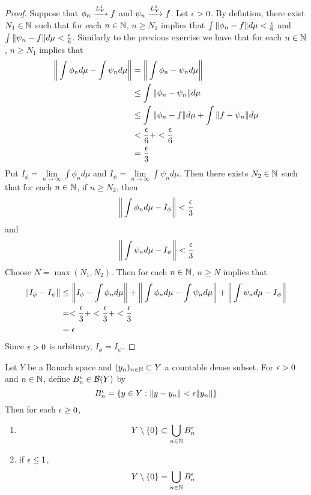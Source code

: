 \documentclass{book}
\begin{document}
	\begin{proof}
	Suppose that $\phi_n \xrightarrow{L^1_Y} f$ and $\psi_n \xrightarrow{L^1_Y} f$. Let $\epsilon >0$. By defintion, there exist $N_1 \in \mathbb{N}$ such that for each $n \in \mathbb{N}$, $ n \geq N_1$ implies that $\int \|\phi_n - f\| d\mu < \frac{\epsilon}{6}$ and $\int \|\psi_n - f\| d\mu < \frac{\epsilon}{6}$. Similarly to the previous exercise we have that for each $n \in \mathbb{N}$, $n \geq N_1$ implies that
	\begin{align*}
	\bigg \| \int \phi_n d\mu  - \int \psi_n d \mu \bigg \|
	&= \bigg \| \int \phi_n - \psi_n d\mu \bigg \| \\
	& \leq \int \| \phi_n - \psi_n \| d\mu \\
	& \leq  \int \| \phi_n -f \| d \mu + \int \| f - \psi_n \| d\mu 	\\
	& <  \frac{\epsilon}{6} + < \frac{\epsilon}{6} \\
	&= \frac{\epsilon}{3}
	\end{align*}	 
Put $I_\phi = \lim\limits_{n \rightarrow \infty} \int \phi_n d\mu$ and $I_{\psi} = \lim\limits_{n \rightarrow \infty} \int \psi_n d\mu$. Then there exists $N_2 \in \mathbb{N}$ such that for each $n \in \mathbb{N}$, if $ n \geq N_2$, then $$\bigg \| \int \phi_n d\mu - I_\phi \bigg \| < \frac{\epsilon}{3}$$ and $$\bigg \| \int \psi_n d\mu - I_\psi \bigg \| < \frac{\epsilon}{3}$$ 
	Choose $N = \max(N_1, N_2)$. Then for each $n \in \mathbb{N}$, $n \geq N$ implies that
	\begin{align*}
	\|I_\phi - I_\psi\| 
	& \leq \bigg \|I_\phi - \int \phi_n d\mu \bigg \| + \bigg \| \int \phi_n d\mu - \int \psi_n d\mu \bigg \| +  \bigg \| \int \psi_n d\mu - I_\psi \bigg \| \\
	& = < \frac{\epsilon}{3} + < \frac{\epsilon}{3} + < \frac{\epsilon}{3} \\
	&= \epsilon
	\end{align*}
	Since $\epsilon >0$ is arbitrary, $I_\phi = I_\psi$.
	\end{proof}
	
	\begin{ex}  
	Let $Y$ be a Banach space and $(y_n)_{n \in \mathbb{N}} \subset Y$ a countable dense subset. For $\epsilon >0$ and $n \in \mathbb{N}$, define $B^{\epsilon}_n \in \mathcal{B}(Y)$ by 
	$$B^{\epsilon}_n = \{y \in Y: \|y - y_n\| < \epsilon \| y_n \| \}$$ 
	Then for each $\epsilon \geq 0$, 
	\begin{enumerate}
		\item $$Y \setminus \{ 0 \} \subset \bigcup\limits_{n \in \mathbb{N}}B^{\epsilon}_n$$
		\item if $\epsilon \leq 1$, $$Y \setminus \{ 0 \} = \bigcup\limits_{n \in \mathbb{N}}B^{\epsilon}_n$$
	\end{enumerate}
	\end{ex}	
	
\end{document}
